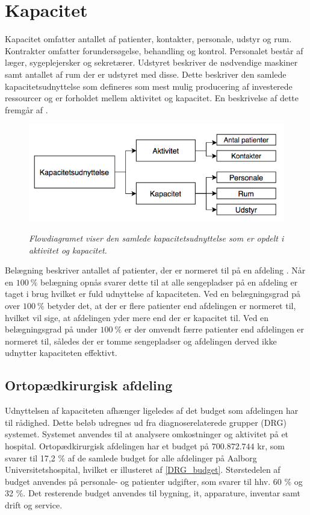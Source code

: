 \section{Kapacitet} \label{kap}
Kapacitet omfatter antallet af patienter, kontakter, personale, udstyr og rum. Kontrakter omfatter forundersøgelse, behandling og kontrol. Personalet består af læger, sygeplejersker og sekretærer. Udstyret beskriver de nødvendige maskiner samt antallet af rum der er udstyret med disse. Dette beskriver den samlede kapacitetsudnyttelse som defineres som  mest mulig producering af investerede ressourcer og er forholdet mellem aktivitet og kapacitet. \cite{Company2013} En beskrivelse af dette fremgår af . 

\begin{figure}[H]
	\flushleft 
	\centering
	\includegraphics[scale=.45]{figures/Kapacitetsudnyttelse.png}
	\label{kapacitet}
	\flushleft
	\caption{\textit{Flowdiagramet viser den samlede kapacitetsudnyttelse som er opdelt i aktivitet og kapacitet.  \cite{Company2013}}}
\end{figure}


\noindent
Belægning beskriver antallet af patienter, der er normeret til på en afdeling \cite{Heidmann2014}. Når en $100~\%$ belægning opnås svarer dette til at alle sengepladser på en afdeling er taget i brug hvilket er fuld udnyttelse af kapaciteten. Ved en belægningsgrad på over $100~\%$ betyder det, at der er flere patienter end afdelingen er normeret til, hvilket vil sige, at afdelingen yder mere end der er kapacitet til. Ved en belægningsgrad på under $100~\%$ er der omvendt færre patienter end afdelingen er normeret til, således der er tomme sengepladser og afdelingen derved ikke udnytter kapaciteten effektivt. \cite{Pauly1986} 

\subsection{Ortopædkirurgisk afdeling}
Udnyttelsen af kapaciteten afhænger ligeledes af det budget som afdelingen har til rådighed. Dette beløb udregnes ud fra diagnoserelaterede grupper (DRG) systemet. Systemet anvendes til at analysere omkostninger og aktivitet på et hospital.\cite{DRG2016} Ortopædkirurgisk afdelingen har et budget på $700.872.744$ kr, som svarer til 17,2 \% af de samlede budget for alle afdelinger på Aalborg Universitetshospital, hvilket er illusteret af \ref{DRG_budget}.\cite{Rasmussen2016}
Størstedelen af budget anvendes på personale- og patienter udgifter, som svarer til hhv. 60 \% og 32 \%. Det resterende budget anvendes til bygning, it, apparature, inventar samt drift og service. 


